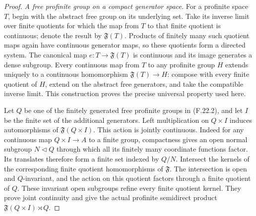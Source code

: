 \begin{proof}
\emph{A free profinite group on a compact generator space.}
For a profinite space $T$, begin with the abstract
free group on its underlying set. Take its inverse
limit over finite quotients for which the map
from $T$ to that finite quotient is continuous;
denote the result by $\mathfrak F(T)$.
Products of finitely many such quotient maps again
have continuous generator maps, so these quotients
form a directed system. The canonical map
$e:T\to\mathfrak F(T)$ is continuous and its
image generates a dense subgroup. Every continuous
map from $T$ to any profinite group $H$ extends
uniquely to a continuous homomorphism
$\mathfrak F(T)\to H$: compose with every finite
quotient of $H$, extend on the abstract free
generators, and take the compatible inverse limit.
This construction proves the precise universal
property used here.

Let $Q$ be one of the finitely generated free
profinite groups in (F.22.2), and let $I$ be the
finite set of the additional generators.
Left multiplication on $Q\times I$ induces
automorphisms of $\mathfrak F(Q\times I)$.
This action is jointly continuous. Indeed for
any continuous map $Q\times I\to A$ to a finite
group, compactness gives an open normal subgroup
$N\triangleleft Q$ through which all its finitely
many coordinate functions factor. Its translates
therefore form a finite set indexed by $Q/N$.
Intersect the kernels of the corresponding
finite quotient homomorphisms of $\mathfrak F$.
The intersection is open and $Q$-invariant, and
the action on this quotient factors through a
finite quotient of $Q$. These invariant open
subgroups refine every finite quotient kernel.
They prove joint continuity and give the actual
profinite semidirect product
$\mathfrak F(Q\times I)\rtimes Q$.


\end{proof}
